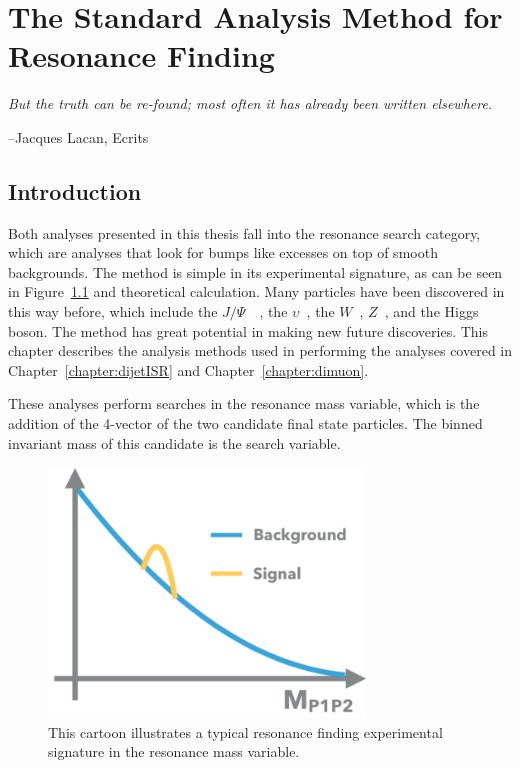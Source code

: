 \chapter{The Standard Analysis Method for Resonance Finding}
\label{chapter:analysismethod}

\epigraph{\textit{But the truth can be re-found; most often it has already been written elsewhere.}}{--Jacques Lacan, Ecrits}


\section{Introduction}
Both analyses presented in this thesis fall into the resonance search category, which are analyses that look for bumps like excesses on top of smooth backgrounds. The method is simple in its experimental signature, as can be seen in Figure~\ref{fig:bump} and theoretical calculation. Many particles have been discovered in this way before, which include the $J/\Psi$~\cite{PhysRevLett.33.1406}~\cite{PhysRevLett.33.1404}, the $\upsilon$~\cite{Herb:1977ek}, the $W$~\cite{Arnison:142059}, $Z$~\cite{hollik1984composite}, and the Higgs boson. The method has great potential in making new future discoveries. This chapter describes
the analysis methods used in performing the analyses covered in Chapter~\ref{chapter:dijetISR} and Chapter~\ref{chapter:dimuon}. 

These analyses perform searches in the resonance mass variable, which is the addition of the 4-vector of the two candidate final state particles. The binned invariant mass of this candidate is the search variable.

\begin{figure}[!htb]
    \begin{center}
        \includegraphics[width=0.75\textwidth]{figures/chapter_analysismethod/resonance}
        \caption{
            This cartoon illustrates a typical resonance finding experimental signature in the resonance mass variable. 
        }
        \label{fig:bump}
    \end{center}
\end{figure}
\FloatBarrier

